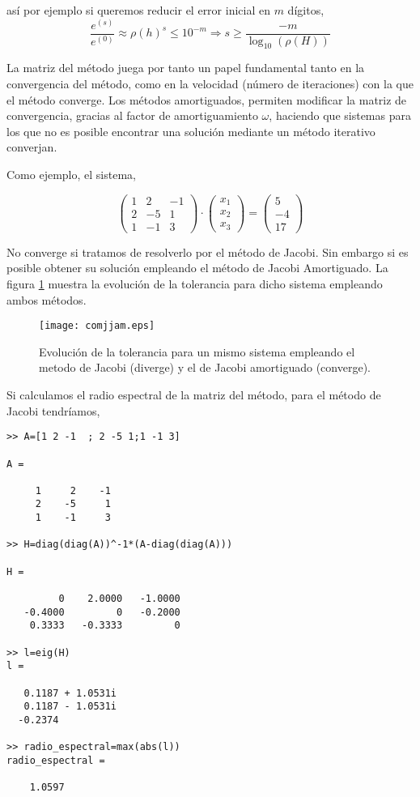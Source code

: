así por ejemplo si queremos reducir el error inicial en $m$ dígitos,
\begin{equation*}
\frac{e^{(s)}}{e^{(0)}} \approx \rho(h)^s \leq 10^{-m} \Rightarrow s \geq \frac{-m}{\log_{10}\left(\rho(H)\right)}
\end{equation*}

La matriz del método juega por tanto un papel fundamental tanto en la convergencia del método, como en la velocidad (número de iteraciones) con la que el método converge. Los métodos amortiguados, permiten modificar la matriz de convergencia, gracias al factor de amortiguamiento $\omega$, haciendo que sistemas para los que no es posible encontrar una solución mediante un método iterativo converjan.

Como ejemplo, el sistema,

\begin{equation*}
\begin{pmatrix}
1& 2& -1\\
2& -5& 1\\
1& -1& 3
\end{pmatrix}\cdot \begin{pmatrix}
x_1\\
x_2\\
x_3
\end{pmatrix}=\begin{pmatrix}
5\\
-4\\
17
\end{pmatrix}
\end{equation*}

No converge si tratamos de resolverlo por el método de Jacobi. Sin embargo si es posible obtener su solución empleando el método de Jacobi Amortiguado. La figura \ref{fig:cjjam}  muestra la evolución de la tolerancia para dicho sistema empleando ambos métodos.

\begin{figure}[h]
\centering
\texttt{[image: comjjam.eps]}
\caption{Evolución de la tolerancia para un mismo sistema empleando el metodo de Jacobi (diverge) y el de Jacobi amortiguado (converge).}
\label{fig:cjjam}


\end{figure}

Si calculamos el radio espectral de la matriz del método, para el método de Jacobi tendríamos,
\begin{verbatim}
>> A=[1 2 -1  ; 2 -5 1;1 -1 3]

A =

     1     2    -1
     2    -5     1
     1    -1     3

>> H=diag(diag(A))^-1*(A-diag(diag(A)))

H =

         0    2.0000   -1.0000
   -0.4000         0   -0.2000
    0.3333   -0.3333         0

>> l=eig(H)
l =

   0.1187 + 1.0531i
   0.1187 - 1.0531i
  -0.2374          

>> radio_espectral=max(abs(l))
radio_espectral =

    1.0597
\end{verbatim}

